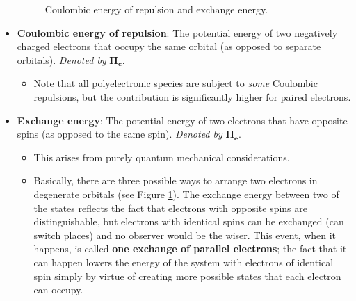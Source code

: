 \documentclass[../main.tex]{subfiles}
\begin{document}
\begin{itemize}
\begin{figure}[H]
        \caption{Coulombic energy of repulsion and exchange energy.}
        \label{fig:coulombExchange}
    \end{figure}
    \item \textbf{Coulombic energy of repulsion}: The potential energy of two negatively charged electrons that occupy the same orbital (as opposed to separate orbitals). \emph{Denoted by} $\bm{\Pi_c}$.
    \begin{itemize}
        \item Note that all polyelectronic species are subject to \emph{some} Coulombic repulsions, but the contribution is significantly higher for paired electrons.
    \end{itemize}
    \item \textbf{Exchange energy}: The potential energy of two electrons that have opposite spins (as opposed to the same spin). \emph{Denoted by} $\bm{\Pi_e}$.
    \begin{itemize}
        \item This arises from purely quantum mechanical considerations.
        \item Basically, there are three possible ways to arrange two electrons in degenerate orbitals (see Figure \ref{fig:coulombExchange}). The exchange energy between two of the states reflects the fact that electrons with opposite spins are distinguishable, but electrons with identical spins can be exchanged (can switch places) and no observer would be the wiser. This event, when it happens, is called \textbf{one exchange of parallel electrons}; the fact that it can happen lowers the energy of the system with electrons of identical spin simply by virtue of creating more possible states that each electron can occupy.
    \end{itemize}
\end{itemize}
\end{document}
